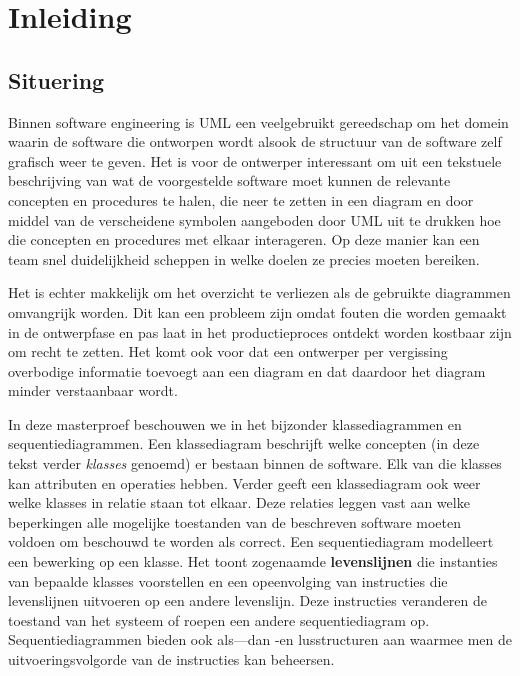 \chapter{Inleiding}

\section{Situering}\label{sec:situering}

Binnen software engineering is UML\cite{RumbaughJames2005Tuml} een veelgebruikt gereedschap om het domein waarin de software die ontworpen wordt alsook de structuur van de software zelf grafisch weer te geven. Het is voor de ontwerper interessant om uit een tekstuele beschrijving van wat de voorgestelde software moet kunnen de relevante concepten en procedures te halen, die neer te zetten in een diagram en door middel van de verscheidene symbolen aangeboden door UML uit te drukken hoe die concepten en procedures met elkaar interageren. Op deze manier kan een team snel duidelijkheid scheppen in welke doelen ze precies moeten bereiken.

Het is echter makkelijk om het overzicht te verliezen als de gebruikte diagrammen omvangrijk worden. Dit kan een probleem zijn omdat fouten die worden gemaakt in de ontwerpfase en pas laat in het productieproces ontdekt worden kostbaar zijn om recht te zetten. Het komt ook voor dat een ontwerper per vergissing overbodige informatie toevoegt aan een diagram en dat daardoor het diagram minder verstaanbaar wordt.

In deze masterproef beschouwen we in het bijzonder klassediagrammen en sequentiediagrammen\cite{RumbaughJames2005Tuml}.
Een klassediagram beschrijft welke concepten (in deze tekst verder \textit{klasses} genoemd) er bestaan binnen de software. Elk van die klasses kan attributen en operaties hebben. Verder geeft een klassediagram ook weer welke klasses in relatie staan tot elkaar. Deze relaties leggen vast aan welke beperkingen alle mogelijke toestanden van de beschreven software moeten voldoen om beschouwd te worden als correct.
Een sequentiediagram modelleert een bewerking op een klasse. Het toont zogenaamde \textbf{levenslijnen} die instanties van bepaalde klasses voorstellen en een opeenvolging van instructies die levenslijnen uitvoeren op een andere levenslijn. Deze instructies veranderen de toestand van het systeem of roepen een andere sequentiediagram op. Sequentiediagrammen bieden ook als---dan -en lusstructuren aan waarmee men de uitvoeringsvolgorde van de instructies kan beheersen.

